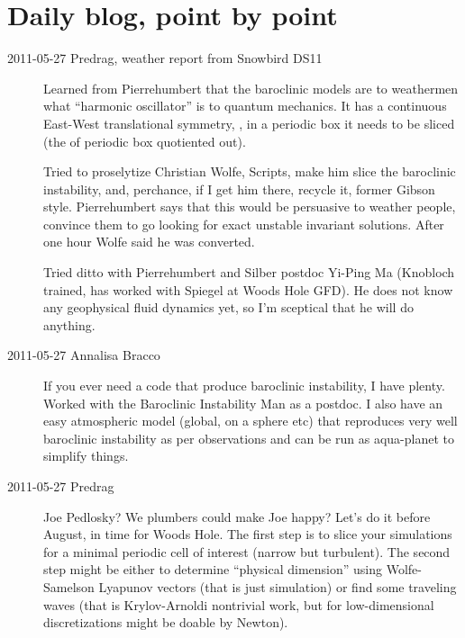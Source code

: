 \section{Daily blog, point by point}
\label{sect:blogBaroclin}


\begin{description}

\item[2011-05-27 Predrag, weather report from Snowbird DS11]
	\toCB
Learned from Pierrehumbert that the baroclinic models are to weathermen
what ``harmonic oscillator'' is to quantum mechanics. It has a continuous
East-West translational symmetry, \ie, in a periodic box it needs to be
sliced (the  of periodic box quotiented out).

Tried to proselytize Christian Wolfe, Scripts,  make him slice
the baroclinic instability, and, perchance, if I get him there, recycle
it, former Gibson style. Pierrehumbert says that this would be persuasive
to weather people, convince them to go looking for exact unstable
invariant solutions. After one hour Wolfe said he was converted.

Tried ditto with Pierrehumbert and Silber postdoc Yi-Ping Ma (Knobloch
trained, has worked with Spiegel at Woods Hole GFD). He does not know any
geophysical fluid dynamics yet, so I'm sceptical that he will do anything.

\item[2011-05-27 Annalisa Bracco]
If you ever need a code that produce baroclinic instability, I have
plenty. Worked with the Baroclinic Instability Man as a postdoc. I also
have an easy atmospheric model (global, on a sphere etc) that reproduces
very well baroclinic instability as per observations and can be run as
aqua-planet to simplify things.

\item[2011-05-27 Predrag]
Joe Pedlosky? We plumbers could make Joe happy? Let's do it before
August, in time for Woods Hole. The first step is to slice your
simulations for a minimal periodic cell of interest (narrow but
turbulent). The second step might be either to determine ``physical
dimension'' using Wolfe-Samelson Lyapunov vectors (that is
just simulation) or find some traveling waves (that is Krylov-Arnoldi
nontrivial work, but for low-dimensional discretizations might be doable
by Newton).


\end{description}
